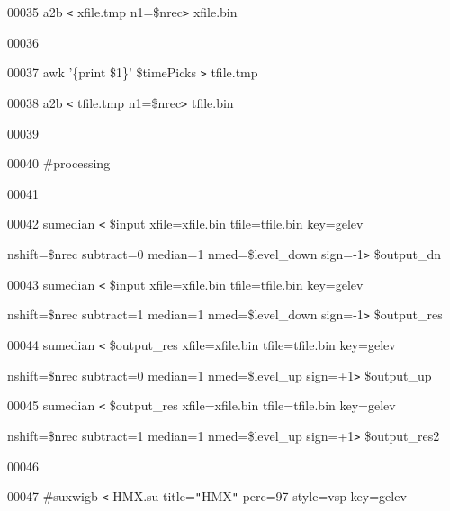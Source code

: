 \documentclass{article}
\begin{document}
\vspace{4pt}
00035 a2b \texttt{<} xfile.tmp n1=\$nrec\texttt{>} xfile.bin

\vspace{4pt}
00036 

\vspace{4pt}
00037 awk '\{print \$1\}' \$timePicks \texttt{>} tfile.tmp

\vspace{4pt}
00038 a2b \texttt{<} tfile.tmp n1=\$nrec\texttt{>} tfile.bin

\vspace{4pt}
00039 

\vspace{4pt}
00040 \#processing

\vspace{4pt}
00041 

\vspace{4pt}
00042 sumedian \texttt{<} \$input xfile=xfile.bin tfile=tfile.bin key=gelev 

\vspace{4pt}
nshift=\$nrec subtract=0 median=1 nmed=\$level\_down sign=-1\texttt{>} \$output\_dn

\vspace{4pt}
00043 sumedian \texttt{<} \$input xfile=xfile.bin tfile=tfile.bin key=gelev 

\vspace{4pt}
nshift=\$nrec subtract=1 median=1 nmed=\$level\_down sign=-1\texttt{>} \$output\_res

\vspace{4pt}
00044 sumedian \texttt{<} \$output\_res xfile=xfile.bin tfile=tfile.bin key=gelev 

\vspace{4pt}
\parindent=18pt
nshift=\$nrec subtract=0 median=1 nmed=\$level\_up sign=+1\texttt{>} \$output\_up

\vspace{4pt}
\parindent=0pt
00045 sumedian \texttt{<} \$output\_res xfile=xfile.bin tfile=tfile.bin key=gelev 

\vspace{4pt}
\parindent=18pt
nshift=\$nrec subtract=1 median=1 nmed=\$level\_up sign=+1\texttt{>} \$output\_res2

\vspace{4pt}
\parindent=0pt
00046 

\vspace{4pt}
00047 \#suxwigb \texttt{<} HMX.su title=\texttt{"}HMX\texttt{"} perc=97 style=vsp 
key=gelev 
\end{document}
